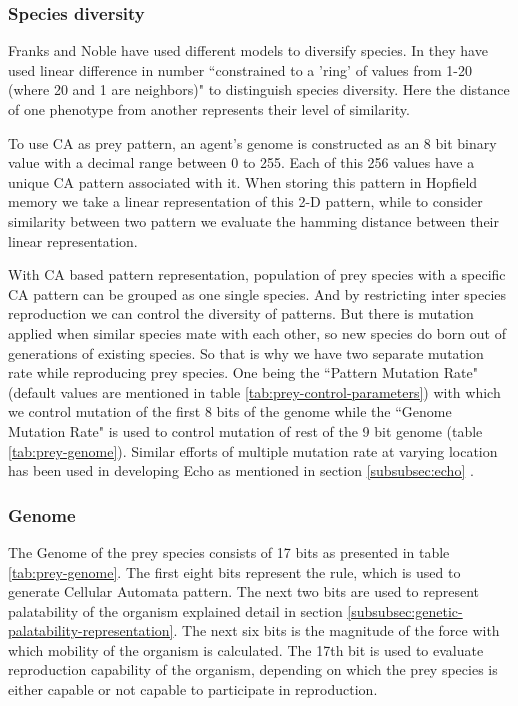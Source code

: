 \documentclass[letterpaper]{article}
\numberwithin{equation}{section}
\begin{document}
\subsubsection{Species diversity}
\label{subsubsec:species-diversity}
Franks and Noble have used different models to diversify species. In \cite{franks2002} they have used linear difference in number ``constrained to a 'ring' of values  from 1-20 (where 20 and 1 are neighbors)" to distinguish species diversity. Here the distance of one phenotype from another represents their level of similarity. 

To use CA as prey pattern, an agent's genome is constructed as an 8 bit binary value with a decimal range between 0 to 255. Each of this 256 values have a unique CA pattern associated with it. When storing this pattern in Hopfield memory we take a linear representation of this 2-D pattern, while to consider similarity between two pattern we evaluate the hamming distance between their linear representation. 

With CA based pattern representation, population of prey species with a specific CA pattern can be grouped as one single species. And by restricting inter species reproduction we can control the diversity of patterns. But there is mutation applied when similar species mate with each other, so new species do born out of generations of existing species. So that is why we have two separate mutation rate while reproducing prey species. One being the ``Pattern Mutation Rate" (default values are mentioned in table \ref{tab:prey-control-parameters}) with which we control mutation of the first 8 bits of the genome while the ``Genome Mutation Rate" is used to control mutation of rest of the 9 bit genome (table \ref{tab:prey-genome}). Similar efforts of multiple mutation rate at varying location has been used in developing Echo as mentioned in section \ref{subsubsec:echo} \cite{hraber1997}.

\subsubsection{Genome}
The Genome of the prey species consists of 17 bits as presented in table \ref{tab:prey-genome}. The first eight bits represent the rule, which is used to generate Cellular Automata pattern. The next two bits are used to represent palatability of the organism explained detail in section \ref{subsubsec:genetic-palatability-representation}. The next six bits is the magnitude of the force with which mobility of the organism is calculated. The 17th bit is used to evaluate reproduction capability of the organism, depending on which the prey species is either capable or not capable to participate in reproduction.
\end{document}
